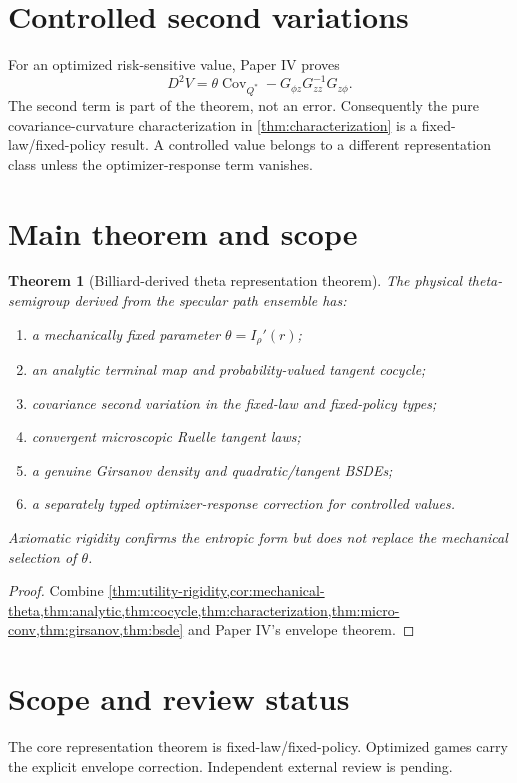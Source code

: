 \documentclass[11pt,reqno]{amsart}
\newtheorem{theorem}{Theorem}[section]
\theoremstyle{definition}
\theoremstyle{remark}
\newcommand{\Cov}{\operatorname{Cov}}
\begin{document}
\section{Controlled second variations}\label{sec:controlled}
For an optimized risk-sensitive value, Paper IV proves
\[
 D^2V
 =\theta\Cov_{Q^*}
 -G_{\phi z}G_{zz}^{-1}G_{z\phi}.
\]
The second term is part of the theorem, not an error.  Consequently the pure
covariance-curvature characterization in \cref{thm:characterization} is a
fixed-law/fixed-policy result.  A controlled value belongs to a different
representation class unless the optimizer-response term vanishes.

\section{Main theorem and scope}\label{sec:main}
\begin{theorem}[Billiard-derived theta representation theorem]\label{thm:main}
The physical theta-semigroup derived from the specular path ensemble has:
\begin{enumerate}[label=(\roman*)]
\item a mechanically fixed parameter $\theta=I_\rho'(r)$;
\item an analytic terminal map and probability-valued tangent cocycle;
\item covariance second variation in the fixed-law and fixed-policy types;
\item convergent microscopic Ruelle tangent laws;
\item a genuine Girsanov density and quadratic/tangent BSDEs;
\item a separately typed optimizer-response correction for controlled values.
\end{enumerate}
Axiomatic rigidity confirms the entropic form but does not replace the
mechanical selection of $\theta$.
\end{theorem}
\begin{proof}
Combine \cref{thm:utility-rigidity,cor:mechanical-theta,thm:analytic,thm:cocycle,thm:characterization,thm:micro-conv,thm:girsanov,thm:bsde} and
Paper IV's envelope theorem.
\end{proof}

\section*{Scope and review status}
The core representation theorem is fixed-law/fixed-policy.  Optimized games
carry the explicit envelope correction.  Independent external review is
pending.

\nocite{*}


\end{document}
